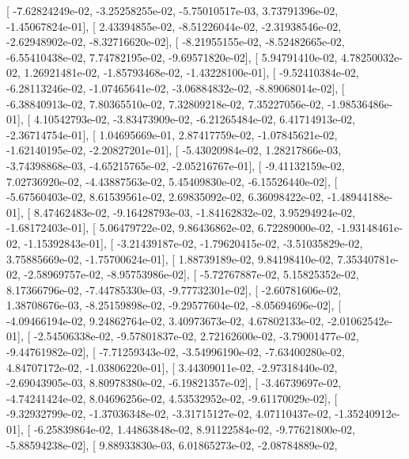 \documentclass{article}
\begin{document}
       [ -7.62824249e-02,  -3.25258255e-02,  -5.75010517e-03,
          3.73791396e-02,  -1.45067824e-01],
       [  2.43394855e-02,  -8.51226044e-02,  -2.31938546e-02,
         -2.62948902e-02,  -8.32716620e-02],
       [ -8.21955155e-02,  -8.52482665e-02,  -6.55410438e-02,
          7.74782195e-02,  -9.69571820e-02],
       [  5.94791410e-02,   4.78250032e-02,   1.26921481e-02,
         -1.85793468e-02,  -1.43228100e-01],
       [ -9.52410384e-02,  -6.28113246e-02,  -1.07465641e-02,
         -3.06884832e-02,  -8.89068014e-02],
       [ -6.38840913e-02,   7.80365510e-02,   7.32809218e-02,
          7.35227056e-02,  -1.98536486e-01],
       [  4.10542793e-02,  -3.83473909e-02,  -6.21265484e-02,
          6.41714913e-02,  -2.36714754e-01],
       [  1.04695669e-01,   2.87417759e-02,  -1.07845621e-02,
         -1.62140195e-02,  -2.20827201e-01],
       [ -5.43020984e-02,   1.28217866e-03,  -3.74398868e-03,
         -4.65215765e-02,  -2.05216767e-01],
       [ -9.41132159e-02,   7.02736920e-02,  -4.43887563e-02,
          5.45409830e-02,  -6.15526440e-02],
       [ -5.67560403e-02,   8.61539561e-02,   2.69835092e-02,
          6.36098422e-02,  -1.48944188e-01],
       [  8.47462483e-02,  -9.16428793e-03,  -1.84162832e-02,
          3.95294924e-02,  -1.68172403e-01],
       [  5.06479722e-02,   9.86436862e-02,   6.72289000e-02,
         -1.93148461e-02,  -1.15392843e-01],
       [ -3.21439187e-02,  -1.79620415e-02,  -3.51035829e-02,
          3.75885669e-02,  -1.75700624e-01],
       [  1.88739189e-02,   9.84198410e-02,   7.35340781e-02,
         -2.58969757e-02,  -8.95753986e-02],
       [ -5.72767887e-02,   5.15825352e-02,   8.17366796e-02,
         -7.44785330e-03,  -9.77732301e-02],
       [ -2.60781606e-02,   1.38708676e-03,  -8.25159898e-02,
         -9.29577604e-02,  -8.05694696e-02],
       [ -4.09466194e-02,   9.24862764e-02,   3.40973673e-02,
          4.67802133e-02,  -2.01062542e-01],
       [ -2.54506338e-02,  -9.57801837e-02,   2.72162600e-02,
         -3.79001477e-02,  -9.44761982e-02],
       [ -7.71259343e-02,  -3.54996190e-02,  -7.63400280e-02,
          4.84707172e-02,  -1.03806220e-01],
       [  3.44309011e-02,  -2.97318440e-02,  -2.69043905e-03,
          8.80978380e-02,  -6.19821357e-02],
       [ -3.46739697e-02,  -4.74241424e-02,   8.04696256e-02,
          4.53532952e-02,  -9.61170029e-02],
       [ -9.32932799e-02,  -1.37036348e-02,  -3.31715127e-02,
          4.07110437e-02,  -1.35240912e-01],
       [ -6.25839864e-02,   1.44863848e-02,   8.91122584e-02,
         -9.77621800e-02,  -5.88594238e-02],
       [  9.88933830e-03,   6.01865273e-02,  -2.08784889e-02,
\end{document}
